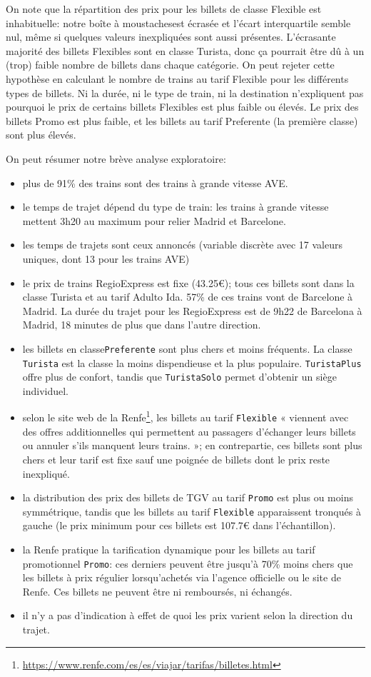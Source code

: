 \documentclass[
  11pt,
  letterpaper,
]{article}
\providecommand{\tightlist}{%
  \setlength{\itemsep}{0pt}\setlength{\parskip}{0pt}}
\renewcommand{\href}[2]{#2\footnote{\url{#1}}}
\theoremstyle{definition}
\theoremstyle{definition}
\theoremstyle{definition}
\theoremstyle{definition}
\theoremstyle{remark}
\begin{document}
On note que la répartition des prix pour les billets de classe Flexible est inhabituelle: notre boîte à moustachesest écrasée et l'écart interquartile semble nul, même si quelques valeurs inexpliquées sont aussi présentes. L'écrasante majorité des billets Flexibles sont en classe Turista, donc ça pourrait être dû à un (trop) faible nombre de billets dans chaque catégorie. On peut rejeter cette hypothèse en calculant le nombre de trains au tarif Flexible pour les différents types de billets. Ni la durée, ni le type de train, ni la destination n'expliquent pas pourquoi le prix de certains billets Flexibles est plus faible ou élevés. Le prix des billets Promo est plus faible, et les billets au tarif Preferente (la première classe) sont plus élevés.

On peut résumer notre brève analyse exploratoire:

\begin{itemize}
\tightlist
\item
  plus de 91\% des trains sont des trains à grande vitesse AVE.
\item
  le temps de trajet dépend du type de train: les trains à grande vitesse mettent 3h20 au maximum pour relier Madrid et Barcelone.
\item
  les temps de trajets sont ceux annoncés (variable discrète avec 17 valeurs uniques, dont 13 pour les trains AVE)
\item
  le prix de trains RegioExpress est fixe (43.25€); tous ces billets sont dans la classe Turista et au tarif Adulto Ida. 57\% de ces trains vont de Barcelone à Madrid. La durée du trajet pour les RegioExpress est de 9h22 de Barcelona à Madrid, 18 minutes de plus que dans l'autre direction.
\item
  les billets en classe\texttt{Preferente} sont plus chers et moins fréquents. La classe \texttt{Turista} est la classe la moins dispendieuse et la plus populaire. \texttt{TuristaPlus} offre plus de confort, tandis que \texttt{TuristaSolo} permet d'obtenir un siège individuel.
\item
  selon le \href{https://www.renfe.com/es/es/viajar/tarifas/billetes.html}{site web de la Renfe}, les billets au tarif \texttt{Flexible} « viennent avec des offres additionnelles qui permettent au passagers d'échanger leurs billets ou annuler s'ils manquent leurs trains. »; en contrepartie, ces billets sont plus chers et leur tarif est fixe sauf une poignée de billets dont le prix reste inexpliqué.
\item
  la distribution des prix des billets de TGV au tarif \texttt{Promo} est plus ou moins symmétrique, tandis que les billets au tarif \texttt{Flexible} apparaissent tronqués à gauche (le prix minimum pour ces billets est 107.7€ dans l'échantillon).
\item
  la Renfe pratique la tarification dynamique pour les billets au tarif promotionnel \texttt{Promo}: ces derniers peuvent être jusqu'à 70\% moins chers que les billets à prix régulier lorsqu'achetés via l'agence officielle ou le site de Renfe. Ces billets ne peuvent être ni remboursés, ni échangés.
\item
  il n'y a pas d'indication à effet de quoi les prix varient selon la direction du trajet.
\end{itemize}
\end{document}
